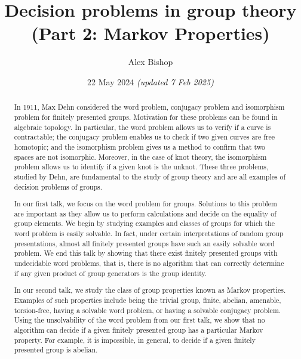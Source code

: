 \documentclass[11pt,a4paper,reqno]{amsart}
\theoremstyle{plain}
\theoremstyle{definition}
\theoremstyle{definition}
\begin{document}
\title{Decision problems in group theory\\(Part 2: Markov Properties)}
\author{Alex Bishop}
\date{22 May 2024 \textit{(updated 7 Feb 2025)}}
\address{%
	Section de mathématiques\\
	Université de Genève\\
	rue du Conseil-Général~7-9\\
	1205 Genève, Switzerland}

\begin{abstract}
	In 1911, Max Dehn considered the word problem, conjugacy problem and isomorphism problem for finitely presented groups. Motivation for these problems can be found in algebraic topology. In particular, the word problem allows us to verify if a curve is contractable; the conjugacy problem enables us to check if two given curves are free homotopic; and the isomorphism problem gives us a method to confirm that two spaces are not isomorphic. Moreover, in the case of knot theory, the isomorphism problem allows us to identify if a given knot is the unknot. These three problems, studied by Dehn, are fundamental to the study of group theory and are all examples of decision problems of groups.

	In our first talk, we focus on the word problem for groups. Solutions to this problem are important as they allow us to perform calculations and decide on the equality of group elements. We begin by studying examples and classes of groups for which the word problem is easily solvable. In fact, under certain interpretations of random group presentations, almost all finitely presented groups have such an easily solvable word problem. We end this talk by showing that there exist finitely presented groups with undecidable word problems, that is, there is no algorithm that can correctly determine if any given product of group generators is the group identity.

	In our second talk, we study the class of group properties known as Markov properties. Examples of such properties include being the trivial group, finite, abelian, amenable, torsion-free, having a solvable word problem, or having a solvable conjugacy problem. Using the unsolvability of the word problem from our first talk, we show that no algorithm can decide if a given finitely presented group has a particular Markov property. For example, it is impossible, in general, to decide if a given finitely presented group is abelian.
\end{abstract}
\maketitle
\end{document}
